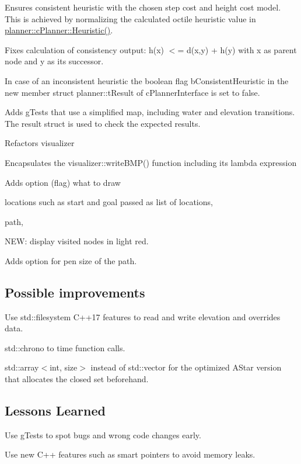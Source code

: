\begin{DoxyItemize}
\item Ensures consistent heuristic with the chosen step cost and height cost model. This is achieved by normalizing the calculated octile heuristic value in \mbox{\hyperlink{classplanner_1_1c_planner_a77cefeae3d7a58a96c74b66f6be22611}{planner\+::c\+Planner\+::\+Heuristic()}}.
\item Fixes calculation of consistency output\+: h(x) $<$= d(x,y) + h(y) with x as parent node and y as its successor.
\item In case of an inconsistent heuristic the boolean flag b\+Consistent\+Heuristic in the new member struct planner\+::t\+Result of c\+Planner\+Interface is set to false.
\item Adds g\+Tests that use a simplified map, including water and elevation transitions. The result struct is used to check the expected results.
\item Refactors visualizer
\begin{DoxyItemize}
\item Encapsulates the visualizer\+::write\+B\+M\+P() function including its lambda expression
\item Adds option (flag) what to draw
\begin{DoxyItemize}
\item locations such as start and goal passed as list of locations,
\item path,
\item N\+EW\+: display visited nodes in light red.
\end{DoxyItemize}
\item Adds option for pen size of the path.
\end{DoxyItemize}
\end{DoxyItemize}

\subsection*{Possible improvements}


\begin{DoxyItemize}
\item Use std\+::filesystem C++17 features to read and write elevation and overrides data.
\item std\+::chrono to time function calls.
\item std\+::array$<$int, size$>$ instead of std\+::vector for the optimized A\+Star version that allocates the closed set beforehand.
\end{DoxyItemize}

\subsection*{Lessons Learned}


\begin{DoxyItemize}
\item Use g\+Tests to spot bugs and wrong code changes early.
\item Use new C++ features such as smart pointers to avoid memory leaks. 
\end{DoxyItemize}